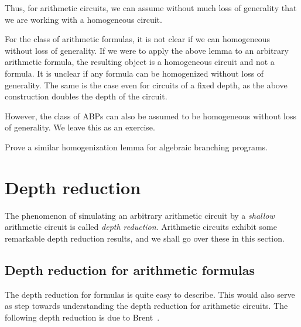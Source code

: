 Thus, for arithmetic circuits, we can assume without much loss of generality that we are working with a homogeneous circuit. 

\begin{remark*}
For the class of arithmetic formulas, it is not clear if we can homogeneous without loss of generality. If we were to apply the above lemma to an arbitrary arithmetic formula, the resulting object is a homogeneous circuit and not a formula. It is unclear if any formula can be homogenized without loss of generality. The same is the case even for circuits of a fixed depth, as the above construction doubles the depth of the circuit. 

However, the class of ABPs can also be assumed to be homogeneous without loss of generality. We leave this as an exercise. 
\end{remark*}

\begin{exercise}
Prove a similar homogenization lemma for algebraic branching programs. 
\end{exercise}

\section{Depth reduction}

The phenomenon of simulating an arbitrary arithmetic circuit by a \emph{shallow} arithmetic circuit is called \emph{depth reduction}. Arithmetic circuits exhibit some remarkable depth reduction results, and we shall go over these in this section. 

\subsection{Depth reduction for arithmetic formulas}

The depth reduction for formulas is quite easy to describe. This would also serve as step towards understanding the depth reduction for arithmetic circuits. The following depth reduction is due to Brent~\cite{brent74}. 


